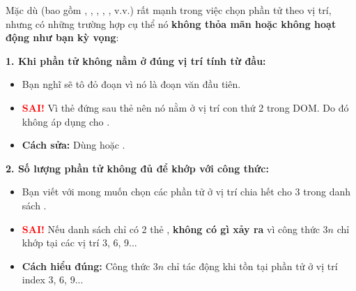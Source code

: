 \begin{warnBox}
Mặc dù  (bao gồm , , , , , v.v.) rất mạnh trong việc chọn phần tử theo vị trí, nhưng có những trường hợp cụ thể nó \textbf{không thỏa mãn hoặc không hoạt động như bạn kỳ vọng}:

\par\vspace{5pt}
\textbf{1. Khi phần tử không nằm ở đúng vị trí tính từ đầu:}
\begin{itemize}[leftmargin=1.5em, itemsep=2pt, parsep=0pt]
    \item Bạn nghĩ  sẽ tô đỏ đoạn  vì nó là đoạn văn đầu tiên.
    \item \textcolor{red}{\textbf{SAI!}} Vì thẻ  đứng sau thẻ  nên nó nằm ở vị trí con thứ 2 trong DOM. Do đó  không áp dụng cho .
    \item \textbf{Cách sửa:} Dùng  hoặc .
\end{itemize}

\par\vspace{5pt}
\textbf{2. Số lượng phần tử không đủ để khớp với công thức:}
\begin{itemize}[leftmargin=1.5em, itemsep=2pt, parsep=0pt]
    \item Bạn viết  với mong muốn chọn các phần tử ở vị trí chia hết cho 3 trong danh sách .
    \item \textcolor{red}{\textbf{SAI!}} Nếu danh sách chỉ có 2 thẻ , \textbf{không có gì xảy ra} vì công thức $3n$ chỉ khớp tại các vị trí 3, 6, 9...
    \item \textbf{Cách hiểu đúng:} Công thức $3n$ chỉ tác động khi tồn tại phần tử ở vị trí index 3, 6, 9...
\end{itemize}


\end{warnBox}
